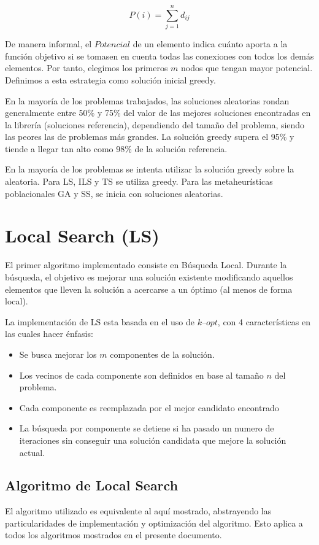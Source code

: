 \documentclass{ci5652}
\begin{document}
$$P(i)=\sum_{j=1}^{n}d_{ij}$$

De manera informal, el $Potencial$ de un elemento indica cuánto aporta a la función objetivo si se tomasen en cuenta todas las conexiones con todos los demás elementos. Por tanto, elegimos los primeros $m$ nodos que tengan mayor potencial. Definimos a esta estrategia como solución inicial greedy.

En la mayoría de los problemas trabajados, las soluciones aleatorias rondan generalmente entre 50\% y 75\% del valor de las mejores soluciones encontradas en la librería (soluciones referencia), dependiendo del tamaño del problema, siendo las peores las de problemas más grandes. La solución greedy supera el 95\% y tiende a llegar tan alto como 98\% de la solución referencia.

En la mayoría de los problemas se intenta utilizar la solución greedy sobre la aleatoria. Para LS, ILS y TS se utiliza greedy. Para las metaheurísticas poblacionales GA y SS, se inicia con soluciones aleatorias.

\section{Local Search (LS)}
El primer algoritmo implementado consiste en Búsqueda Local. Durante la búsqueda, el objetivo es mejorar una solución existente modificando aquellos elementos que lleven la solución a acercarse a un óptimo (al menos de forma local).

La implementación de LS esta basada en el uso de $k\text{--}opt$, con 4 características en las cuales hacer énfasis:
\begin{itemize} \itemsep5pt
	\item Se busca mejorar los $m$ componentes de la solución.
	\item Los vecinos de cada componente son definidos en base al tamaño $n$ del problema.
	\item Cada componente es reemplazada por el mejor candidato encontrado
	\item La búsqueda por componente se detiene si ha pasado un numero de iteraciones sin conseguir una solución candidata que mejore la solución actual.
\end{itemize}

\subsection{Algoritmo de Local Search}
El algoritmo utilizado es equivalente al aquí mostrado, abstrayendo las particularidades de implementación y optimización del algoritmo. Esto aplica a todos los algoritmos mostrados en el presente documento.
\end{document}
